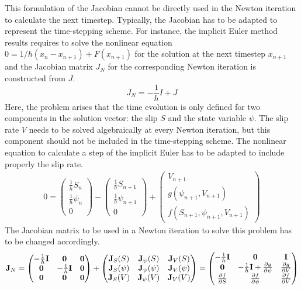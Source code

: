 This formulation of the Jacobian cannot be directly used in the Newton iteration to calculate the next timestep. Typically, the Jacobian has to be adapted to represent the time-stepping scheme. For instance, the implicit Euler method results requires to solve the nonlinear equation $0 = 1/h(x_n - x_{n+1}) + F(x_{n+1})$ for the solution at the next timestep $x_{n+1}$ and the Jacobian matrix $J_N$ for the corresponding Newton iteration is constructed from $J$. 
\begin{equation}
J_N = -\frac{1}{h}I + J
\end{equation}
Here, the problem arises that the time evolution is only defined for two components in the solution vector: the slip $S$ and the state variable $\psi$. The slip rate $V$ needs to be solved algebraically at every Newton iteration, but this component should not be included in the time-stepping scheme. The nonlinear equation to calculate a step of the implicit Euler has to be adapted to include properly the slip rate. 
\begin{align}
0 = \begin{pmatrix} \frac{1}{h}S_n     \\ \frac{1}{h}\psi_n     \\ 0 \end{pmatrix} - 
\begin{pmatrix} \frac{1}{h}S_{n+1} \\ \frac{1}{h}\psi_{n+1} \\ 0 \end{pmatrix} + 
\begin{pmatrix} V_{n+1}            \\ g(\psi_{n+1},V_{n+1}) \\ f(S_{n+1}, \psi_{n+1}, V_{n+1}) \end{pmatrix}
\end{align}
The Jacobian matrix to be used in a Newton iteration to solve this problem has to be changed accordingly.
\begin{align}
\label{eq:Jacobian_Newton_Iteration_extended_DAE}
\mathbf{J}_N = 
\begin{pmatrix} 
-\frac{1}{h}\mathbf{I} & \mathbf{0}            & \mathbf{0} \\ 
\mathbf{0}             &-\frac{1}{h}\mathbf{I} & \mathbf{0} \\ 
\mathbf{0}             & \mathbf{0}            & \mathbf{0} 
\end{pmatrix} + 
\begin{pmatrix}  
\mathbf{J}_S(S)    &  \mathbf{J}_\psi(S)    &  \mathbf{J}_V(S)    \\ 
\mathbf{J}_S(\psi) &  \mathbf{J}_\psi(\psi) &  \mathbf{J}_V(\psi) \\ 
\mathbf{J}_S(V)    &  \mathbf{J}_\psi(V)    &  \mathbf{J}_V(V)
\end{pmatrix} =
\begin{pmatrix} 
-\frac{1}{h}\mathbf{I}         &  \mathbf{0} 			            &
\mathbf{I}                     \\ 
\mathbf{0}                    & 
-\frac{1}{h}\mathbf{I} +  \pdv{g}{\psi}       &  \pdv{g}{V} \\ 
\pdv{f}{S} & \pdv{f}{\psi} &  \pdv{f}{V} 
\end{pmatrix}
\end{align}
